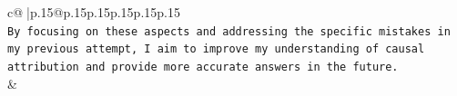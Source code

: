 \documentclass{article}
\begin{document}
{\begin{supertabular}{c@{$\;$}|p{.15\linewidth}@{}p{.15\linewidth}p{.15\linewidth}p{.15\linewidth}p{.15\linewidth}p{.15\linewidth}}
{{{\\ 
\texttt{By focusing on these aspects and addressing the specific mistakes in my previous attempt, I aim to improve my understanding of causal attribution and provide more accurate answers in the future.} \\
            }
        }
    }
    & \\ \\

\end{supertabular}
}
\end{document}
